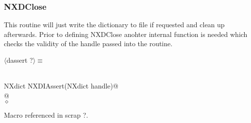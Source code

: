 \documentclass[12pt]{article}
\begin{document}
\subsubsection{NXDClose}
This routine will just write the dictionary to file if requested and clean
up afterwards. Prior to defining NXDClose anohter internal function is
needed which checks the validity of the handle passed into the routine.

\begin{flushleft} \small
\begin{minipage}{\linewidth} \label{scrap12}
$\langle$dassert {\footnotesize ?}$\rangle\equiv$
\vspace{-1ex}
\begin{list}{}{} \item
\mbox{}\verb@@\\
\mbox{}\verb@   NXdict NXDIAssert(NXdict handle)@\\
\mbox{}@\\
\mbox{}\verb@@$\diamond$
\end{list}
\vspace{-1ex}
\footnotesize\addtolength{\baselineskip}{-1ex}
\begin{list}{}{\setlength{\itemsep}{-\parsep}\setlength{\itemindent}{-\leftmargin}}
\item Macro referenced in scrap ?.
\end{list}
\end{minipage}\\[4ex]
\end{flushleft}
\end{document}

